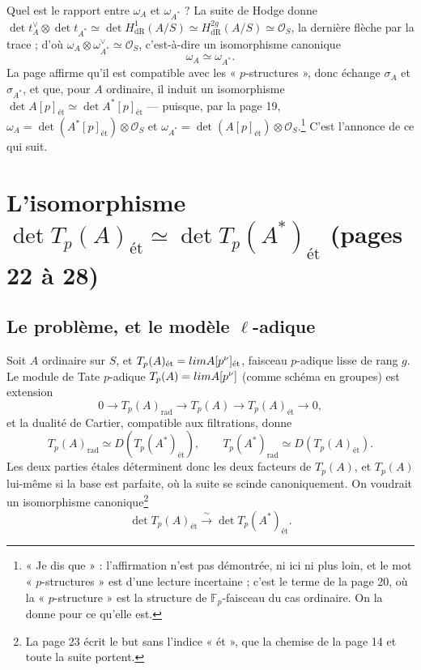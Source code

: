 \documentclass[11pt,a4paper]{article}
\begin{document}
Quel est le rapport entre $\omega_A$ et $\omega_{A^*}$ ? La suite de Hodge
donne $\det t_A^\vee \otimes \det t_{A^*} \simeq \det H^1_{\mathrm{dR}}(A/S)
\simeq H^{2g}_{\mathrm{dR}}(A/S) \simeq \mathcal{O}_S$, la dernière flèche par
la trace ; d'où $\omega_A \otimes \omega_{A^*}^{\vee} \simeq \mathcal{O}_S$,
c'est-à-dire un isomorphisme canonique
\[
\omega_A \simeq \omega_{A^*} .
\]
La page affirme qu'il est compatible avec les « $p$-structures », donc
échange $\sigma_A$ et $\sigma_{A^*}$, et que, pour $A$ ordinaire, il induit un
isomorphisme $\det A[p]_{\text{ét}} \simeq \det A^*[p]_{\text{ét}}$ ---
puisque, par la page 19, $\omega_A = \det(A^*[p]_{\text{ét}}) \otimes
\mathcal{O}_S$ et $\omega_{A^*} = \det(A[p]_{\text{ét}}) \otimes
\mathcal{O}_S$.\footnote{« Je dis que » : l'affirmation n'est pas démontrée,
ni ici ni plus loin, et le mot « $p$-structures » est d'une lecture
incertaine ; c'est le terme de la page 20, où la « $p$-structure » est la
structure de $\mathbb{F}_p$-faisceau du cas ordinaire. On la donne pour ce
qu'elle est.} C'est l'annonce de ce qui suit.

\section*{L'isomorphisme $\det T_p(A)_{\text{ét}} \simeq \det T_p(A^*)_{\text{ét}}$ (pages 22 à 28)}

\subsection*{Le problème, et le modèle $\ell$-adique}

Soit $A$ ordinaire sur $S$, et $T_p(A)_{\text{ét}} = \varprojlim
A[p^\nu]_{\text{ét}}$, faisceau $p$-adique lisse de rang $g$. Le module de
Tate $p$-adique $T_p(A) = \varprojlim A[p^\nu]$ (comme schéma en groupes) est
extension
\[
0 \to T_p(A)_{\mathrm{rad}} \to T_p(A) \to T_p(A)_{\text{ét}} \to 0 ,
\]
et la dualité de Cartier, compatible aux filtrations, donne
\[
T_p(A)_{\mathrm{rad}} \simeq D(T_p(A^*)_{\text{ét}}) , \qquad
T_p(A^*)_{\mathrm{rad}} \simeq D(T_p(A)_{\text{ét}}) .
\]
Les deux parties étales déterminent donc les deux facteurs de $T_p(A)$, et
$T_p(A)$ lui-même si la base est parfaite, où la suite se scinde
canoniquement. On voudrait un isomorphisme canonique\footnote{La page 23 écrit le but sans l'indice « ét », que la chemise de la
page 14 et toute la suite portent.}
\[
\det T_p(A)_{\text{ét}} \xrightarrow{\ \sim\ } \det T_p(A^*)_{\text{ét}} .
\]
\end{document}
